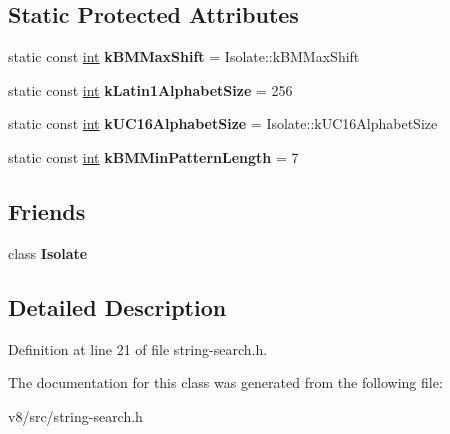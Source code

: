 \subsection*{Static Protected Attributes}
\begin{DoxyCompactItemize}
\item 
\mbox{\label{classv8_1_1internal_1_1StringSearchBase_ad471d0ad669c9cdabae5866875a9ecaa}} 
static const \mbox{\hyperlink{classint}{int}} {\bfseries k\+B\+M\+Max\+Shift} = Isolate\+::k\+B\+M\+Max\+Shift
\item 
\mbox{\label{classv8_1_1internal_1_1StringSearchBase_a1d21eb5372b2cb6a03cafe43844c9bb6}} 
static const \mbox{\hyperlink{classint}{int}} {\bfseries k\+Latin1\+Alphabet\+Size} = 256
\item 
\mbox{\label{classv8_1_1internal_1_1StringSearchBase_a6c6e53551e567bd63a758f1450515272}} 
static const \mbox{\hyperlink{classint}{int}} {\bfseries k\+U\+C16\+Alphabet\+Size} = Isolate\+::k\+U\+C16\+Alphabet\+Size
\item 
\mbox{\label{classv8_1_1internal_1_1StringSearchBase_a92b11d18d2e45bda7dd25674c58369b0}} 
static const \mbox{\hyperlink{classint}{int}} {\bfseries k\+B\+M\+Min\+Pattern\+Length} = 7
\end{DoxyCompactItemize}
\subsection*{Friends}
\begin{DoxyCompactItemize}
\item 
\mbox{\label{classv8_1_1internal_1_1StringSearchBase_aba4f0964bdacf2bbf62cf876e5d28d0a}} 
class {\bfseries Isolate}
\end{DoxyCompactItemize}


\subsection{Detailed Description}


Definition at line 21 of file string-\/search.\+h.



The documentation for this class was generated from the following file\+:\begin{DoxyCompactItemize}
\item 
v8/src/string-\/search.\+h\end{DoxyCompactItemize}
